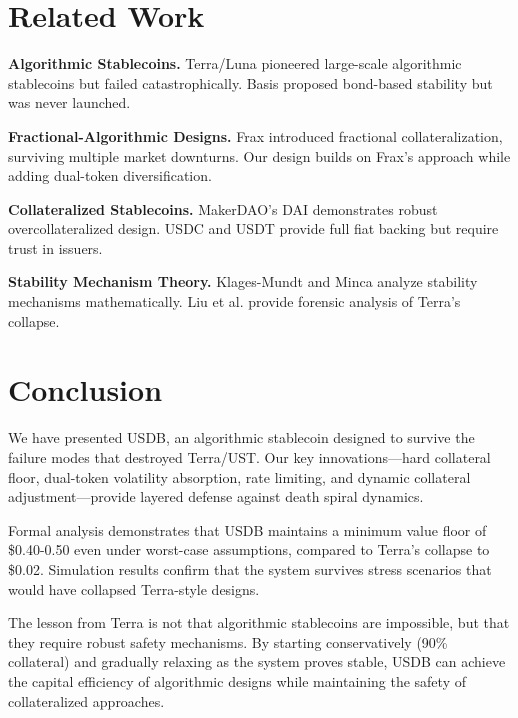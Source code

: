 \documentclass[11pt,a4paper]{article}
\begin{document}
\section{Related Work}
\label{sec:related}

\textbf{Algorithmic Stablecoins.} Terra/Luna \cite{Kereiakes2019} pioneered large-scale algorithmic stablecoins but failed catastrophically. Basis \cite{AlNaji2018} proposed bond-based stability but was never launched.

\textbf{Fractional-Algorithmic Designs.} Frax \cite{Kazemian2020} introduced fractional collateralization, surviving multiple market downturns. Our design builds on Frax's approach while adding dual-token diversification.

\textbf{Collateralized Stablecoins.} MakerDAO's DAI \cite{MakerDAO2017} demonstrates robust overcollateralized design. USDC and USDT provide full fiat backing but require trust in issuers.

\textbf{Stability Mechanism Theory.} Klages-Mundt and Minca \cite{KlagesMundt2021} analyze stability mechanisms mathematically. Liu et al. \cite{Liu2023} provide forensic analysis of Terra's collapse.

\section{Conclusion}
\label{sec:conclusion}

We have presented USDB, an algorithmic stablecoin designed to survive the failure modes that destroyed Terra/UST. Our key innovations---hard collateral floor, dual-token volatility absorption, rate limiting, and dynamic collateral adjustment---provide layered defense against death spiral dynamics.

Formal analysis demonstrates that USDB maintains a minimum value floor of \$0.40-0.50 even under worst-case assumptions, compared to Terra's collapse to \$0.02. Simulation results confirm that the system survives stress scenarios that would have collapsed Terra-style designs.

The lesson from Terra is not that algorithmic stablecoins are impossible, but that they require robust safety mechanisms. By starting conservatively (90\% collateral) and gradually relaxing as the system proves stable, USDB can achieve the capital efficiency of algorithmic designs while maintaining the safety of collateralized approaches.
\end{document}
